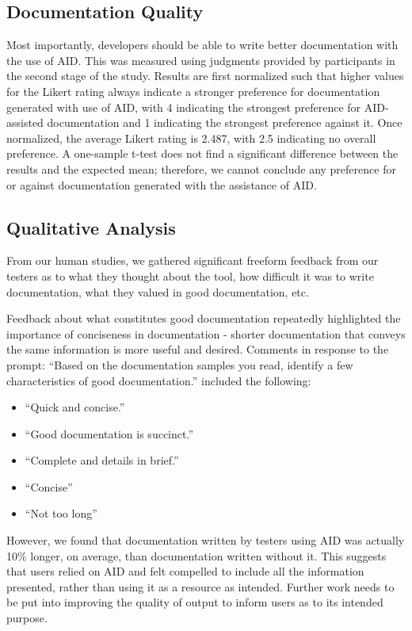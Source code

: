 \documentclass[preprint]{sigplanconf}
\begin{document}
\subsection{Documentation Quality}
Most importantly, developers should be able to write better documentation with the use of AID. This was measured using judgments provided by participants in the second stage of the study. Results are first normalized such that higher values for the Likert rating always indicate a stronger preference for documentation generated with use of AID, with 4 indicating the strongest preference for AID-assisted documentation and 1 indicating the strongest preference against it. Once normalized, the average Likert rating is 2.487, with 2.5 indicating no overall preference. A one-sample t-test does not find a significant difference between the results and the expected mean; therefore, we cannot conclude any preference for or against documentation generated with the assistance of AID.

\subsection{Qualitative Analysis}
From our human studies, we gathered significant freeform feedback from our testers as to what they thought about the tool, how difficult it was to write documentation, what they valued in good documentation, etc.

Feedback about what constitutes good documentation repeatedly highlighted the importance of conciseness in documentation - shorter documentation that conveys the same information is more useful and desired. Comments in response to the prompt: ``Based on the documentation samples you read, identify a few characteristics of good documentation.'' included the following:

\begin{itemize}
\item ``Quick and concise.''
\item ``Good documentation is succinct.''
\item ``Complete and details in brief.''
\item ``Concise''
\item ``Not too long''
\end{itemize}

However, we found that documentation written by testers using AID was actually 10\% longer, on average, than documentation written without it. This suggests that users relied on AID and felt compelled to include all the information presented, rather than using it as a resource as intended. Further work needs to be put into improving the quality of output to inform users as to its intended purpose.
\end{document}
